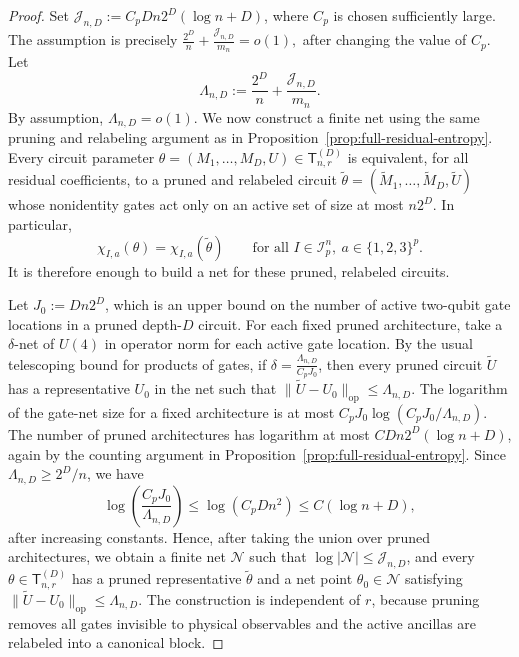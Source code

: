 \documentclass[12pt]{article}
\newcommand{\mcI}{\mathcal{I}}
\newcommand{\mcJ}{\mathcal{J}}
\begin{document}
\begin{proof}
Set $\mcJ_{n,D}:=C_pDn2^D(\log n+D)$, where \(C_p\) is chosen sufficiently large. The assumption is precisely $\frac{2^D}{n}+\frac{\mcJ_{n,D}}{m_n}=o(1),$ after changing the value of \(C_p\).  Let
\[
\Lambda_{n,D}
:=
\frac{2^D}{n}
+
\frac{\mcJ_{n,D}}{m_n}.
\]
By assumption, \(\Lambda_{n,D}=o(1)\). We now construct a finite net using the
same pruning and relabeling argument as in Proposition~\ref{prop:full-residual-entropy}.
Every circuit parameter $\theta=(M_1,\dots,M_D,U)\in\mathsf{T}_{n,r}^{(D)}$ is equivalent, for all residual coefficients, to a pruned and relabeled circuit $\widetilde\theta
    =
    (\widetilde M_1,\dots,\widetilde M_D,\widetilde U)$ whose nonidentity gates act only on an active set of size at most
\(n2^D\). In particular,
\[
    \chi_{I,a}(\theta)
    =
    \chi_{I,a}(\widetilde\theta)
    \qquad
    \text{for all } I\in\mcI_p^n,\ a\in\{1,2,3\}^p .
\]
It is therefore enough to build a net for these pruned, relabeled  circuits.

Let \(J_0:=Dn2^D\), which is an upper bound on the number of active two-qubit
gate locations in a pruned depth-\(D\) circuit. For each fixed pruned architecture, take a \(\delta\)-net of \(U(4)\) in operator norm for
each active gate location. By the usual telescoping bound for products of gates, if $\delta=\frac{\Lambda_{n,D}}{C_pJ_0}$, then every pruned circuit \(\widetilde U\) has a representative
\(U_0\) in the net such that $\|\widetilde U-U_0\|_{\mathrm{op}}\le \Lambda_{n,D}$. The logarithm of the gate-net size for a fixed architecture is at most $C_pJ_0\log(C_pJ_0/\Lambda_{n,D})$. The number of pruned  architectures has logarithm at most
\(C Dn2^D(\log n+D)\), again by the counting argument in
Proposition~\ref{prop:full-residual-entropy}. Since $\Lambda_{n,D}\ge 2^D/n$, we have
\[
\log\left(\frac{C_pJ_0}{\Lambda_{n,D}}\right)
\le
\log(C_pD n^2)
\le
C(\log n+D),
\]
after increasing constants. Hence, after taking the union over pruned architectures, we obtain a finite net \(\mathcal N\) such that $\log|\mathcal N|
    \le
    \mcJ_{n,D}$, and every \(\theta\in\mathsf T_{n,r}^{(D)}\) has a pruned 
representative \(\widetilde\theta\) and a net point \(\theta_0\in\mathcal N\)
satisfying $\|\widetilde U-U_0\|_{\mathrm{op}}\le \Lambda_{n,D}$. The construction is independent of \(r\), because pruning removes all gates
invisible to physical observables and the active ancillas are relabeled into a canonical block.





\end{proof}
\end{document}

